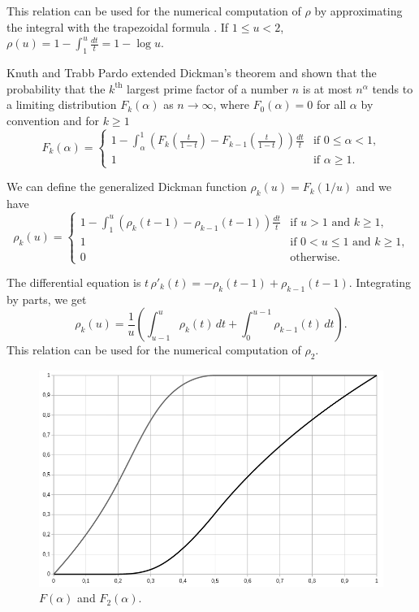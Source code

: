 \documentclass[a4paper, 11pt, pdftex]{report}
\theoremstyle{plain}
\theoremstyle{definition}
\begin{document}
This relation can be used for the numerical computation of $\rho$ by approximating the integral
with the trapezoidal formula \cite{LuneWattel1}. If $1 \leq u < 2$,
$\rho(u) = 1 - \int_1^u \frac{dt}{t} = 1 - \log u$.

Knuth and Trabb Pardo \cite{KnuthPardo1} extended Dickman's theorem and shown that the
probability that the $k^\text{th}$ largest prime factor of a number $n$ is at most $n^\alpha$
tends to a limiting distribution $F_k(\alpha)$ as $n \to \infty$, where $F_0(\alpha) = 0$ for all
$\alpha$ by convention and for $k \geq 1$
\begin{equation*}
F_k(\alpha) = \begin{cases}
1 - \int_\alpha^1 \left( F_k \left(\frac{t}{1-t} \right) - F_{k-1} \left(\frac{t}{1-t} \right) \right) \frac{dt}{t} & \text{if } 0 \leq \alpha < 1 \text{,}\\
1& \text{if } \alpha \geq 1 \text{.}
\end{cases}
\end{equation*}

We can define the generalized Dickman function $\rho_k(u) = F_k(1/u)$ and we have
\begin{equation*}
\rho_k(u) = \begin{cases}
1 - \int_1^u \left( \rho_k(t - 1) - \rho_{k-1}(t - 1) \right) \frac{dt}{t}
  & \text{if } u > 1 \text{ and } k\geq 1\text{,}\\
1& \text{if } 0 < u \leq 1 \text{ and } k\geq 1\text{,}\\
0& \text{otherwise.}
\end{cases}
\end{equation*}

The differential equation is $t\, \rho'_k(t) = -\rho_k(t - 1) + \rho_{k-1}(t - 1)$.
Integrating by parts, we get
$$\rho_k(u) = \frac{1}{u} \left( \int_{u-1}^u \rho_k(t)\, dt + \int_0^{u-1} \rho_{k-1}(t)\, dt \right).$$
This relation can be used for the numerical computation of $\rho_2$.
\newpage

\begin{figure}[!ht]
	\centering
	\includegraphics[width=15.5cm, angle=0]{img/F1_F2.png}
	\caption{\label{fig:F_12} $F(\alpha)$ and $F_2(\alpha)$.}
\end{figure}
\end{document}
